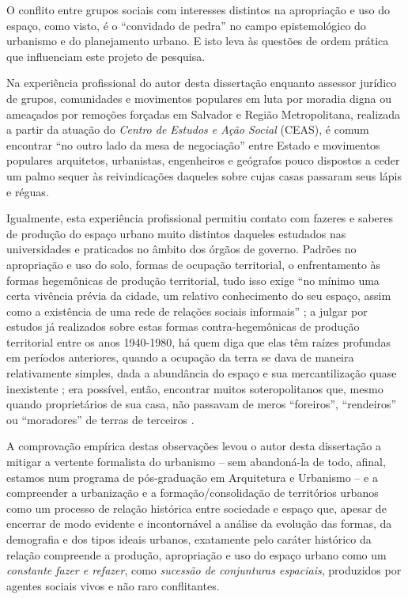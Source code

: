 O conflito entre grupos sociais com interesses distintos na apropriação e uso do espaço, como visto, é o ``convidado de pedra'' no campo epistemológico do urbanismo e do planejamento urbano. E isto leva às questões de ordem prática que influenciam este projeto de pesquisa.

Na experiência profissional do autor desta dissertação enquanto assessor jurídico de grupos, comunidades e movimentos populares em luta por moradia digna ou ameaçados por remoções forçadas em Salvador e Região Metropolitana, realizada a partir da atuação do \textit{Centro de Estudos e Ação Social} (CEAS), é comum encontrar ``no outro lado da mesa de negociação'' entre Estado e movimentos populares arquitetos, urbanistas, engenheiros e geógrafos pouco dispostos a ceder um palmo sequer às reivindicações daqueles sobre cujas casas passaram seus lápis e réguas.

Igualmente, esta experiência profissional permitiu contato com fazeres e saberes de produção do espaço urbano muito distintos daqueles estudados nas universidades e praticados no âmbito dos órgãos de governo. Padrões no apropriação e uso do solo, formas de ocupação territorial, o enfrentamento às formas hegemônicas de produção territorial, tudo isso exige ``no mínimo uma certa vivência prévia da cidade, um relativo conhecimento do seu espaço, assim como a existência de uma rede de relações sociais informais'' \cite[p.~40]{MATTEDI1981}; a julgar por estudos já realizados sobre estas formas contra-hegemônicas de produção territorial entre os anos 1940-1980, há quem diga que elas têm raízes profundas em períodos anteriores, quando a ocupação da terra se dava de maneira relativamente simples, dada a abundância do espaço e sua mercantilização quase inexistente \cite[p.~25]{MOURA1990}; era possível, então, encontrar muitos soteropolitanos que, mesmo quando proprietários de sua casa, não passavam de meros ``foreiros'', ``rendeiros'' ou ``moradores'' de terras de terceiros \cite[p.~139]{BRANDAO1980}.

A comprovação empírica destas observações levou o autor desta dissertação a mitigar a vertente formalista do urbanismo – sem abandoná-la de todo, afinal, estamos num programa de pós-graduação em Arquitetura e Urbanismo – e a compreender a urbanização e a formação/consolidação de territórios urbanos como um processo de relação histórica entre sociedade e espaço \cite{CASTELLS2000, SANTOS2008} que, apesar de encerrar de modo evidente e incontornável a análise da evolução das formas, da demografia e dos tipos ideais urbanos, exatamente pelo caráter histórico da relação compreende a produção, apropriação e uso do espaço urbano como um \textit{constante fazer e refazer}, como \textit{sucessão de conjunturas espaciais}, produzidos por agentes sociais vivos e não raro conflitantes.

